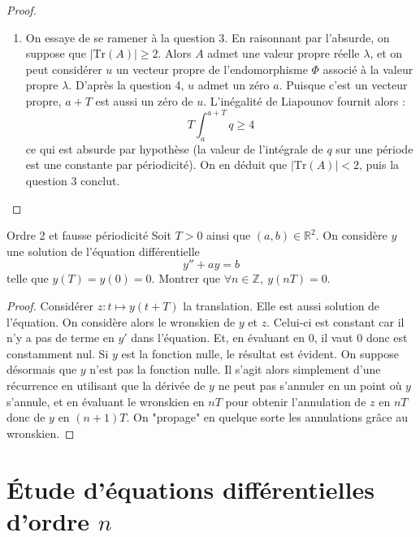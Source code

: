 \documentclass[french,a4paper]{article}
\newcommand{\Z}{\mathbb{Z}}
\newcommand{\R}{\mathbb{R}}
\newcommand{\Tr}{\text{Tr}}
\theoremstyle{plain}
\theoremstyle{definition}
\theoremstyle{remark}
\begin{document}
\begin{proof}
\begin{enumerate}
		\item On essaye de se ramener à la question $3$. En raisonnant par l'absurde, on suppose que $\lvert\Tr(A)\rvert\geqslant2$. Alors $A$ admet une valeur propre réelle $\lambda$, et on peut considérer $u$ un vecteur propre de l'endomorphisme $\Phi$ associé à la valeur propre $\lambda$. D'après la question 4, $u$ admet un zéro $a$. Puisque c'est un vecteur propre, $a+T$ est aussi un zéro de $u$. L'inégalité de Liapounov fournit alors : $$T\int_a^{a+T} q\geqslant 4$$ ce qui est absurde par hypothèse (la valeur de l'intégrale de $q$ sur une période est une constante par périodicité). On en déduit que $\lvert\Tr(A)\rvert<2$, puis la question 3 conclut.
	\end{enumerate}
\end{proof}

\begin{ex}[Rax]{Ordre 2 et fausse périodicité}
	Soit $T>0$ ainsi que $(a,b)\in\R^2$. On considère $y$ une solution de l'équation différentielle $$y''+ay=b$$ telle que $y(T)=y(0)=0$. Montrer que $\forall n\in\Z,\ y(nT)=0$.
\end{ex}
\begin{proof}
	Considérer $z:t\mapsto y(t+T)$ la translation. Elle est aussi solution de l'équation. On considère alors le wronskien de $y$ et $z$. Celui-ci est constant car il n'y a pas de terme en $y'$ dans l'équation. Et, en évaluant en 0, il vaut $0$ donc est constamment nul. Si $y$ est la fonction nulle, le résultat est évident. On suppose désormais que $y$ n'est pas la fonction nulle. Il s'agit alors simplement d'une récurrence en utilisant que la dérivée de $y$ ne peut pas s'annuler en un point où $y$ s'annule, et en évaluant le wronskien en $nT$ pour obtenir l'annulation de $z$ en $nT$ donc de $y$ en $(n+1)T$. On "propage" en quelque sorte les annulations grâce au wronskien.
\end{proof}


\section{Étude d'équations différentielles d'ordre $n$}
\end{document}
